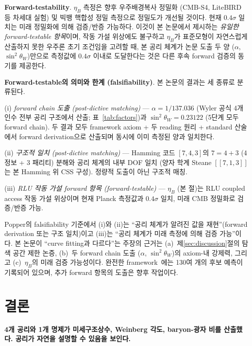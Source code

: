 \documentclass[entropy,article,submit,pdftex,oneauthor]{Definitions/mdpi}
\begin{document}
\textbf{Forward-testability}. $\eta_B$ 측정은 향후 우주배경복사 정밀화 (CMB-S4, LiteBIRD 등 차세대 실험) 및 빅뱅 핵합성 정밀 측정으로 정밀도가 개선될 것이다. 현재 $0.4\sigma$ 일치는 미래 정밀화에 의해 검증/반증 가능하다. 이것이 본 논문에서 제시하는 \emph{유일한 forward-testable 항목}이며, 작동 가설 위상에도 불구하고 $\eta_B$가 표준모형이 자연스럽게 산출하지 못한 우주론 초기 조건임을 고려할 때, 본 공리 체계가 논문 도출 두 양 ($\alpha$, $\sin^2\theta_W$)만으로 측정값에 $0.4\sigma$ 이내로 도달한다는 것은 다른 후속 forward 검증의 동기를 제공한다.

\textbf{Forward-testable의 의미와 한계 (falsifiability)}.
본 논문의 결과는 세 종류로 분류된다.

(i) \emph{forward chain 도출 (post-dictive matching)} --- $\alpha = 1/137.036$ (Wyler 공식 4개 인수 전부 공리 구조에서 산출; 표~\ref{tab:factors})과 $\sin^2\theta_W = 0.23122$ (5단계 모두 forward chain). 두 결과 모두 framework axiom + 두 reading 원리 + standard 산술에서 forward derivation으로 산출되며 동시에 이미 측정된 양과 일치한다.

(ii) \emph{구조적 일치 (post-dictive matching)} --- Hamming 코드 $[7,4,3]$의 $7 = 4 + 3$ (4 정보 + 3 패리티) 분해와 공리 체계의 내부 DOF 일치 (양자 학계 Steane $[[7,1,3]]$는 본 Hamming 위 CSS 구성). 정량적 도출이 아닌 구조적 매칭.

(iii) \emph{RLU 작동 가설 forward 항목 (forward-testable)} --- $\eta_B$ (본 절)는 RLU coupled access 작동 가설 위상이며 현재 Planck 측정값과 $0.4\sigma$ 일치, 미래 CMB 정밀화로 검증/반증 가능.

Popper의 falsifiability 기준에서 (i)와 (ii)는 ``공리 체계가 알려진 값을 재현''(forward derivation 또는 구조 일치)이고 (iii)는 ``공리 체계가 미래 측정에 의해 검증 가능''이다. 본 논문이 ``curve fitting과 다르다''는 주장의 근거는 (a)~제\ref{sec:discussion}절의 탐색 공간 제한 논증, (b)~두 forward chain 도출 ($\alpha$, $\sin^2\theta_W$)의 axiom-내 강제력, 그리고 (c)~$\eta_B$의 미래 검증 가능성이다. 완전한 framework~\cite{han2026}에는 130여 개의 후보 예측이 기록되어 있으며, 추가 forward 항목의 도출은 향후 작업이다.

\section{결론}
\label{sec:conclusion}

\textbf{4개 공리와 1개 명제가 미세구조상수, Weinberg 각도, baryon-광자 비를 산출했다. 공리가 자연을 설명할 수 있음을 보인다.}
\end{document}
